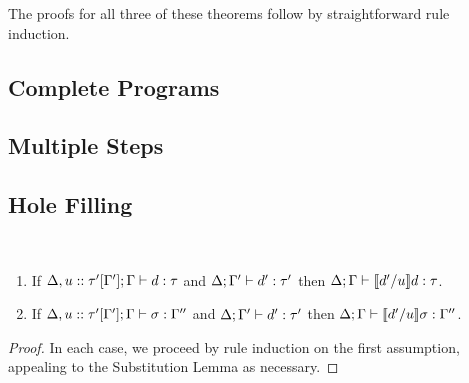 The proofs for all three of these theorems follow by straightforward rule induction.


\clearpage
\subsection{Complete Programs}



\subsection{Multiple Steps}


\clearpage
\subsection{Hole Filling}\label{sec:hole-filling}
\begin{lem}[Filling] ~
  \begin{enumerate}[nolistsep]
  \item If $\Delta, u :: \tau'[\Gamma']; \Gamma \vdash d : \tau$
  and $\Delta; \Gamma' \vdash d' : \tau'$
  then $\Delta; \Gamma \vdash \llbracket d' / u\rrbracket d : \tau$.
  \item If $\Delta, u :: \tau'[\Gamma']; \Gamma \vdash \sigma : \Gamma''$
  and $\Delta; \Gamma' \vdash d' : \tau'$
  then $\Delta; \Gamma \vdash \llbracket d' / u\rrbracket \sigma : \Gamma''$.
  \end{enumerate}
\end{lem}
\begin{proof}
In each case, we proceed by rule induction on the first assumption, appealing to the Substitution Lemma as necessary.
\end{proof}

